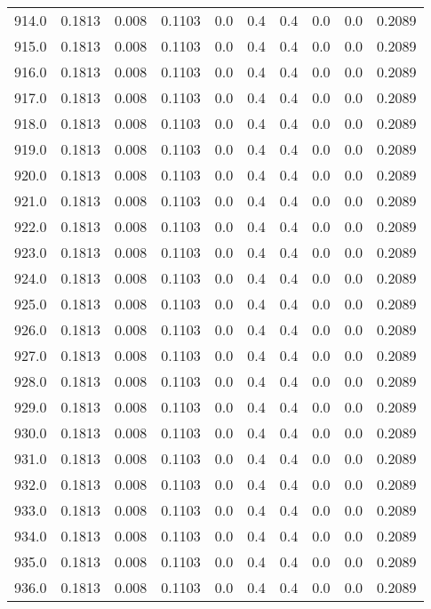 \begin{longtable}{lrrrrrrrrr}
914.0 & 0.1813 & 0.008 & 0.1103 & 0.0 & 0.4 & 0.4 & 0.0 & 0.0 & 0.2089 \\
915.0 & 0.1813 & 0.008 & 0.1103 & 0.0 & 0.4 & 0.4 & 0.0 & 0.0 & 0.2089 \\
916.0 & 0.1813 & 0.008 & 0.1103 & 0.0 & 0.4 & 0.4 & 0.0 & 0.0 & 0.2089 \\
917.0 & 0.1813 & 0.008 & 0.1103 & 0.0 & 0.4 & 0.4 & 0.0 & 0.0 & 0.2089 \\
918.0 & 0.1813 & 0.008 & 0.1103 & 0.0 & 0.4 & 0.4 & 0.0 & 0.0 & 0.2089 \\
919.0 & 0.1813 & 0.008 & 0.1103 & 0.0 & 0.4 & 0.4 & 0.0 & 0.0 & 0.2089 \\
920.0 & 0.1813 & 0.008 & 0.1103 & 0.0 & 0.4 & 0.4 & 0.0 & 0.0 & 0.2089 \\
921.0 & 0.1813 & 0.008 & 0.1103 & 0.0 & 0.4 & 0.4 & 0.0 & 0.0 & 0.2089 \\
922.0 & 0.1813 & 0.008 & 0.1103 & 0.0 & 0.4 & 0.4 & 0.0 & 0.0 & 0.2089 \\
923.0 & 0.1813 & 0.008 & 0.1103 & 0.0 & 0.4 & 0.4 & 0.0 & 0.0 & 0.2089 \\
924.0 & 0.1813 & 0.008 & 0.1103 & 0.0 & 0.4 & 0.4 & 0.0 & 0.0 & 0.2089 \\
925.0 & 0.1813 & 0.008 & 0.1103 & 0.0 & 0.4 & 0.4 & 0.0 & 0.0 & 0.2089 \\
926.0 & 0.1813 & 0.008 & 0.1103 & 0.0 & 0.4 & 0.4 & 0.0 & 0.0 & 0.2089 \\
927.0 & 0.1813 & 0.008 & 0.1103 & 0.0 & 0.4 & 0.4 & 0.0 & 0.0 & 0.2089 \\
928.0 & 0.1813 & 0.008 & 0.1103 & 0.0 & 0.4 & 0.4 & 0.0 & 0.0 & 0.2089 \\
929.0 & 0.1813 & 0.008 & 0.1103 & 0.0 & 0.4 & 0.4 & 0.0 & 0.0 & 0.2089 \\
930.0 & 0.1813 & 0.008 & 0.1103 & 0.0 & 0.4 & 0.4 & 0.0 & 0.0 & 0.2089 \\
931.0 & 0.1813 & 0.008 & 0.1103 & 0.0 & 0.4 & 0.4 & 0.0 & 0.0 & 0.2089 \\
932.0 & 0.1813 & 0.008 & 0.1103 & 0.0 & 0.4 & 0.4 & 0.0 & 0.0 & 0.2089 \\
933.0 & 0.1813 & 0.008 & 0.1103 & 0.0 & 0.4 & 0.4 & 0.0 & 0.0 & 0.2089 \\
934.0 & 0.1813 & 0.008 & 0.1103 & 0.0 & 0.4 & 0.4 & 0.0 & 0.0 & 0.2089 \\
935.0 & 0.1813 & 0.008 & 0.1103 & 0.0 & 0.4 & 0.4 & 0.0 & 0.0 & 0.2089 \\
936.0 & 0.1813 & 0.008 & 0.1103 & 0.0 & 0.4 & 0.4 & 0.0 & 0.0 & 0.2089 \\

\end{longtable}
